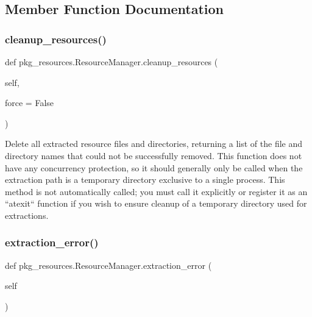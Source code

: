 \subsection{Member Function Documentation}
\mbox{\label{classpkg__resources_1_1ResourceManager_a85ba051ec7d82f0803dd96e45df1d21d}} 
\subsubsection{\texorpdfstring{cleanup\+\_\+resources()}{cleanup\_resources()}}
{\footnotesize\ttfamily def pkg\+\_\+resources.\+Resource\+Manager.\+cleanup\+\_\+resources (\begin{DoxyParamCaption}\item[{}]{self,  }\item[{}]{force = {\ttfamily False} }\end{DoxyParamCaption})}

\begin{DoxyVerb}Delete all extracted resource files and directories, returning a list
of the file and directory names that could not be successfully removed.
This function does not have any concurrency protection, so it should
generally only be called when the extraction path is a temporary
directory exclusive to a single process.  This method is not
automatically called; you must call it explicitly or register it as an
``atexit`` function if you wish to ensure cleanup of a temporary
directory used for extractions.
\end{DoxyVerb}
 \mbox{\label{classpkg__resources_1_1ResourceManager_a39f27f35ad11069273856a00d26df314}} 
\subsubsection{\texorpdfstring{extraction\+\_\+error()}{extraction\_error()}}
{\footnotesize\ttfamily def pkg\+\_\+resources.\+Resource\+Manager.\+extraction\+\_\+error (\begin{DoxyParamCaption}\item[{}]{self }\end{DoxyParamCaption})}

